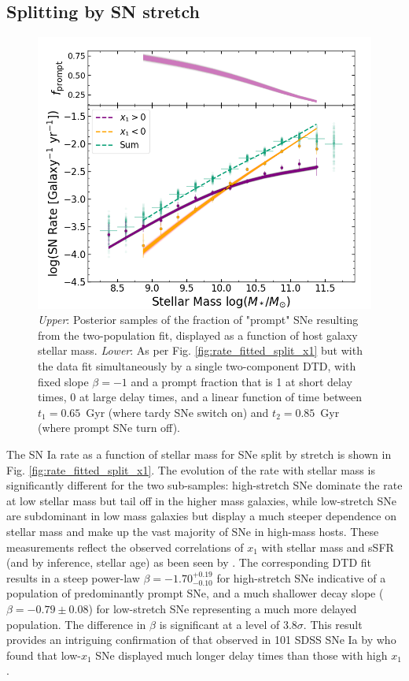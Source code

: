 \documentclass[fleqn,usenatbib]{mnras}
\begin{document}
\subsection{Splitting by SN stretch \label{subsec:split_x1}}

\begin{figure}
    \centering
    \includegraphics[width=.5\textwidth]{figs/rate_vs_mass_DTD_fit_beta_norm_Qerf1.1_split_x1_fitjoint.png}
    \caption{\textit{Upper}: Posterior samples of the fraction of "prompt" SNe resulting from the two-population fit, displayed as a function of host galaxy stellar mass. 
    \textit{Lower}: As per Fig. \ref{fig:rate_fitted_split_x1} but with the data fit simultaneously by a single two-component DTD, with fixed slope $\beta = -1$ and a prompt fraction that is 1 at short delay times, 0 at large delay times, and a linear function of time between $t_1 =0.65$~Gyr (where tardy SNe switch on) and $t_2=0.85$~Gyr (where prompt SNe turn off).%
    \label{fig:rate_fitted_split_x1_2c_DTD}}
\end{figure}
The SN Ia rate as a function of stellar mass for SNe split by stretch is shown in Fig. \ref{fig:rate_fitted_split_x1}. The evolution of the rate with stellar mass is significantly different for the two sub-samples: high-stretch SNe dominate the rate at low stellar mass but tail off in the higher mass galaxies, while low-stretch SNe are subdominant in low mass galaxies but display a much steeper dependence on stellar mass and make up the vast majority of SNe in high-mass hosts. These measurements reflect the observed correlations of $x_1$ with stellar mass and sSFR (and by inference, stellar age) as been seen by \citet{Rigault2013,Graur2017,Rigault2018,Rose2019,Nicolas2020,Rose2021}. The corresponding DTD fit results in a steep power-law $\beta =-1.70^{+0.19}_{-0.10}$ for high-stretch SNe indicative of a population of predominantly prompt SNe, and a much shallower decay slope ($\beta = -0.79 \pm 0.08$) for low-stretch SNe representing a much more delayed population. The difference in $\beta$ is significant at a level of $3.8\sigma$. This result provides an intriguing confirmation of that observed in 101 SDSS SNe Ia by \citet{Brandt2010} who found that low-$x_1$ SNe displayed much longer delay times than those with high $x_1$.
\end{document}
